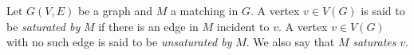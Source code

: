 \documentclass[12pt]{article}
\newcommand{\<}{\langle}
\renewcommand{\>}{\rangle}
\begin{document}
Let $G(V,E)$ be a graph and $M$ a matching in $G$.  A vertex $v\in V(G)$ is said to be \emph{saturated by} $M$ if there is an edge in $M$ incident to $v$.  A vertex $v\in V(G)$ with no such edge is said to be \emph{unsaturated by} $M$.  We also say that $M$ \emph{saturates} $v$.
\end{document}
